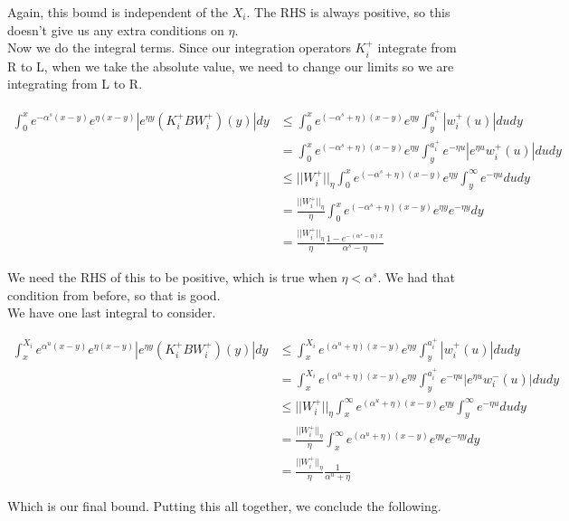 \documentclass[12pt]{article}
\begin{document}
Again, this bound is independent of the $X_i$. The RHS is always positive, so this doesn't give us any extra conditions on $\eta$. \\

Now we do the integral terms. Since our integration operators $K_i^+$ integrate from R to L, when we take the absolute value, we need to change our limits so we are integrating from L to R.

\begin{align*}
\int_0^x e^{-\alpha^s (x-y)}e^{\eta(x-y)}|e^{\eta y} (K_i^+ B W_i^+)(y)| dy &\leq \int_0^x e^{(-\alpha^s + \eta)(x-y)}e^{\eta y} \int_y^{a_i^+} |w_i^+(u)| du dy \\
&= \int_0^x e^{(-\alpha^s + \eta)(x-y)}e^{\eta y} \int_y^{a_i^+} e^{-\eta u} |e^{\eta u} w_i^+(u)| du dy \\
&\leq ||W_i^+||_\eta \int_0^x e^{(-\alpha^s + \eta)(x-y)}e^{\eta y} \int_y^\infty e^{-\eta u} du dy \\
&= \frac{||W_i^+||_\eta}{\eta} \int_0^x e^{(-\alpha^s + \eta)(x-y)}e^{\eta y} e^{-\eta y} dy \\
&= \frac{||W_i^+||_\eta}{\eta} \frac{1 - e^{-(\alpha^s - \eta)x}}{\alpha^s - \eta} 
\end{align*}

We need the RHS of this to be positive, which is true when $\eta < \alpha^s$. We had that condition from before, so that is good.\\

We have one last integral to consider.

\begin{align*}
\int_x^{X_i} e^{\alpha^u (x-y)}e^{\eta(x-y)}|e^{\eta y} (K_i^+ B W_i^+)(y)| dy &\leq \int_x^{X_i} e^{(\alpha^u + \eta)(x-y)}e^{\eta y} \int_y^{a_i^+} |w_i^+(u)| du dy \\
&= \int_x^{X_i} e^{(\alpha^u + \eta)(x-y)}e^{\eta y} \int_y^{a_i^+} e^{-\eta u} |e^{\eta u} w_i^-(u)| du dy \\
&\leq ||W_i^+||_\eta \int_x^\infty e^{(\alpha^u + \eta)(x-y)}e^{\eta y} \int_y^\infty e^{-\eta u} du dy \\
&= \frac{||W_i^+||_\eta}{\eta} \int_x^\infty e^{(\alpha^u + \eta)(x-y)}e^{\eta y} e^{-\eta y} dy \\
&= \frac{||W_i^+||_\eta}{\eta} \frac{1}{\alpha^u + \eta}
\end{align*}

Which is our final bound. Putting this all together, we conclude the following.\\
\end{document}

